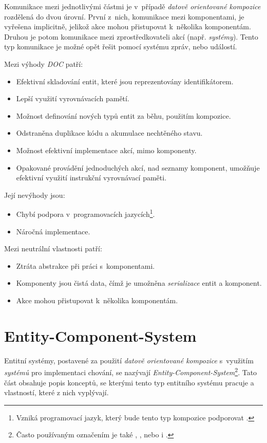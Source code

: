 Komunikace mezi jednotlivými částmi je v~případě \emph{datově orientované kompozice} rozdělená do dvou úrovní. První z~nich, komunikace mezi komponentami, je vyřešena implicitně, jelikož akce mohou přistupovat k~několika komponentám. Druhou je potom komunikace mezi zprostředkovateli akcí (např. \emph{systémy}). Tento typ komunikace je možné opět řešit pomocí systému zpráv, nebo událostí. 

\pagebreak

\noindent Mezi výhody \emph{DOC} patří: 
\begin{itemize}
	\item Efektivní skladování entit, které jsou reprezentovány identifikátorem.
	\item Lepší využití vyrovnávacích pamětí.
	\item Možnost definování nových typů entit za běhu, použitím kompozice.
	\item Odstraněna duplikace kódu a akumulace nechtěného stavu.
	\item Možnost efektivní implementace akcí, mimo komponenty.
	\item Opakované provádění jednoduchých akcí, nad seznamy komponent, umožňuje efektivní využití instrukční vyrovnávací paměti.
\end{itemize}

\noindent Její nevýhody jsou: 
\begin{itemize}
	\item Chybí podpora v~programovacích jazycích\footnote{Vzniká programovací jazyk, který bude tento typ kompozice podporovat \cite{OOHLang}.}.
	\item Náročná implementace.
\end{itemize}

\noindent Mezi neutrální vlastnosti patří:
\begin{itemize}
	\item Ztráta abstrakce při práci s~komponentami.
	\item Komponenty jsou čistá data, čímž je umožněna \emph{serializace} entit a komponent.
	\item Akce mohou přistupovat k~několika komponentám.
\end{itemize}

\section{Entity-Component-System}
\label{Chap:EntitySystem} 

Entitní systémy, postavené za použití \emph{datově orientované kompozice} s~využitím \emph{systémů} pro implementaci chování, se nazývají \emph{Entity-Component-System}\footnote{Často používaným označením je také ,  , nebo i .}. Tato část obsahuje popis konceptů, se kterými tento typ entitního systému pracuje a vlastností, které z nich vyplývají.

